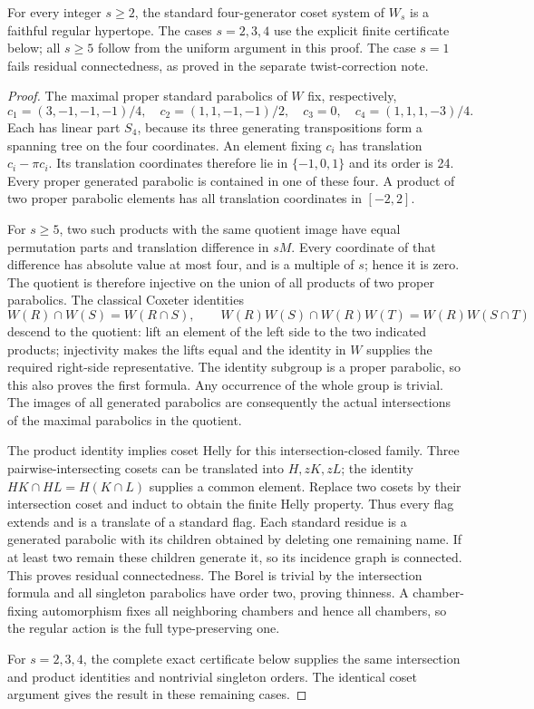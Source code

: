 \begin{theorem}
For every integer $s\geq2$, the standard four-generator coset system
of $W_s$ is a faithful regular hypertope. The cases $s=2,3,4$ use
the explicit finite certificate below; all $s\geq5$ follow from the
uniform argument in this proof. The case $s=1$ fails residual
connectedness, as proved in the separate twist-correction note.
\end{theorem}
\begin{proof}
The maximal proper standard parabolics of $W$ fix, respectively,
\[
 c_1=(3,-1,-1,-1)/4,\quad c_2=(1,1,-1,-1)/2,
 \quad c_3=0,\quad c_4=(1,1,1,-3)/4.
\]
Each has linear part $S_4$, because its three generating
transpositions form a spanning tree on the four coordinates. An
element fixing $c_i$ has translation $c_i-\pi c_i$. Its translation
coordinates therefore lie in $\{-1,0,1\}$ and its order is 24.
Every proper generated parabolic is contained in one of these four.
A product of two proper parabolic elements has all translation
coordinates in $[-2,2]$.

For $s\geq5$, two such products with the same quotient image have
equal permutation parts and translation difference in $sM$. Every
coordinate of that difference has absolute value at most four, and
is a multiple of $s$; hence it is zero. The quotient is therefore
injective on the union of all products of two proper parabolics.
The classical Coxeter identities
\[
 W(R)\cap W(S)=W(R\cap S),\qquad
 W(R)W(S)\cap W(R)W(T)=W(R)W(S\cap T)
\]
descend to the quotient: lift an element of the left side to the
two indicated products; injectivity makes the lifts equal and the
identity in $W$ supplies the required right-side representative.
The identity subgroup is a proper parabolic, so this also proves
the first formula. Any occurrence of the whole group is trivial.
The images of all generated parabolics are consequently the actual
intersections of the maximal parabolics in the quotient.

The product identity implies coset Helly for this intersection-closed
family. Three pairwise-intersecting cosets can be translated into
$H,zK,zL$; the identity $HK\cap HL=H(K\cap L)$ supplies a
common element. Replace two cosets by their intersection coset and
induct to obtain the finite Helly property. Thus every flag extends
and is a translate of a standard flag. Each standard residue is a
generated parabolic with its children obtained by deleting one
remaining name. If at least two remain these children generate it,
so its incidence graph is connected. This proves residual
connectedness. The Borel is trivial by the intersection formula and
all singleton parabolics have order two, proving thinness. A
chamber-fixing automorphism fixes all neighboring chambers and hence
all chambers, so the regular action is the full type-preserving one.

For $s=2,3,4$, the complete exact certificate below supplies the same
intersection and product identities and nontrivial singleton orders.
The identical coset argument gives the result in these remaining cases.
\end{proof}

